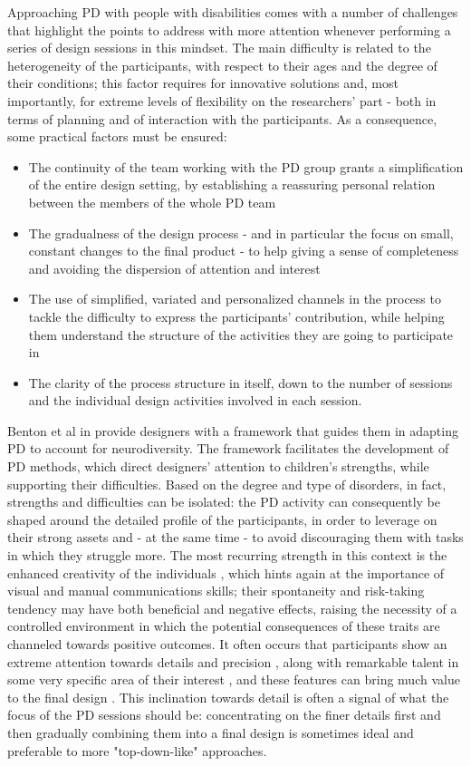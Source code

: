 Approaching PD with people with disabilities comes with a number of challenges that highlight the points to address with more attention whenever performing a series of design sessions in this mindset. The main difficulty is related to the heterogeneity of the participants, with respect to their ages and the degree of their conditions; this factor requires for innovative solutions and, most importantly, for extreme levels of flexibility on the researchers' part - both in terms of planning and of interaction with the
participants. As a consequence, some practical factors must be ensured:
\begin{itemize}
\item The continuity of the team working with the PD group grants a simplification of the entire design setting, by establishing a reassuring personal relation between the members of the whole PD team
\item The gradualness of the design process - and in particular the focus on small, constant changes to the final product - to help giving a sense of completeness and avoiding the dispersion of attention and interest
\item The use of simplified, variated and personalized channels in the process to tackle the difficulty to express the participants' contribution, while helping them understand the structure of the activities they are going to participate in
\item The clarity of the process structure in itself, down to the number of sessions and the individual design activities involved in each session.
\end{itemize}
Benton et al in \cite{Benton} provide designers with a framework that guides them in adapting PD to account for neurodiversity. The framework facilitates the development of PD methods, which direct designers' attention to children's strengths, while supporting their difficulties. Based on the
degree and type of disorders, in fact, strengths and difficulties can be isolated: the PD activity can consequently be shaped around the detailed profile of the participants, in order to leverage on their strong assets and - at the same time - to avoid discouraging them with tasks in which they struggle more.
The most recurring strength in this context is the enhanced creativity of the individuals \cite{Warr}, which hints again at the importance of visual and manual communications skills; their spontaneity and risk-taking tendency may have both beneficial and negative effects, raising the necessity of a controlled
environment in which the potential consequences of these traits are channeled towards positive outcomes. It often occurs that participants show an extreme attention towards details and precision , along with remarkable talent in some very specific area of their interest , and these features can bring much value to the final design \cite{Tredici}. This inclination towards detail is often a signal of what the focus of the PD sessions should be: concentrating on the finer details first and then gradually combining them into a final design is sometimes ideal and preferable to more "top-down-like" approaches.\\
